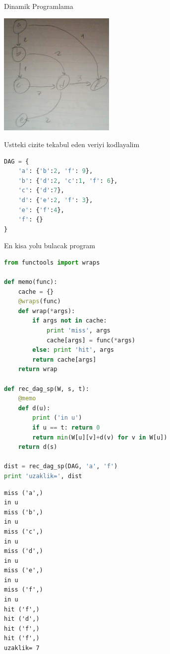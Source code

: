 \documentclass[12pt,fleqn]{article}\usepackage{../common}
\begin{document}
Dinamik Programlama

\includegraphics[height=6cm]{dp1.jpg}

Ustteki cizite tekabul eden veriyi kodlayalim

\begin{lstlisting}[language=Python]
DAG = {
    'a': {'b':2, 'f': 9},
    'b': {'d':2, 'c':1, 'f': 6},
    'c': {'d':7},
    'd': {'e':2, 'f': 3},
    'e': {'f':4},
    'f': {}
}
\end{lstlisting}

En kisa yolu bulacak program

\begin{lstlisting}[language=Python]
from functools import wraps

def memo(func):
    cache = {}                                  
    @wraps(func)                                
    def wrap(*args):                            
        if args not in cache:
            print 'miss', args
            cache[args] = func(*args)
        else: print 'hit', args
        return cache[args]                      
    return wrap 

def rec_dag_sp(W, s, t):                        
    @memo                                       
    def d(u):
        print ('in u')
        if u == t: return 0                     
        return min(W[u][v]+d(v) for v in W[u])  
    return d(s)                                 

dist = rec_dag_sp(DAG, 'a', 'f')
print 'uzaklik=', dist
\end{lstlisting}

\begin{verbatim}
miss ('a',)
in u
miss ('b',)
in u
miss ('c',)
in u
miss ('d',)
in u
miss ('e',)
in u
miss ('f',)
in u
hit ('f',)
hit ('d',)
hit ('f',)
hit ('f',)
uzaklik= 7
\end{verbatim}
\end{document}
